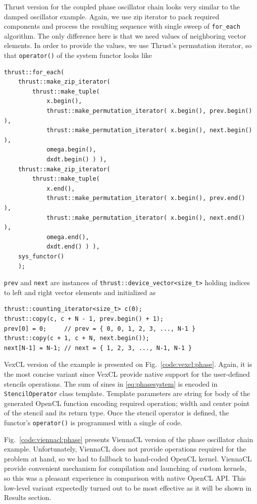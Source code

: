 \documentclass[1p]{elsarticle}
\newcommand{\code}[1]{\lstinline|#1|}
\newcommand{\figref}[1]{Fig.~\ref{#1}}
\begin{document}
Thrust version for the coupled phase oscillator chain looks very similar to the
damped oscillator example. Again, we use zip iterator to pack required
components and process the resulting sequence with single sweep of
\code{for_each} algorithm. The only difference here is that we need values of
neighboring vector elements. In order to provide the values, we use Thrust's
permutation iterator, so that \code{operator()} of the system functor looks
like
\begin{lstlisting}[frame=leftline]
thrust::for_each(
    thrust::make_zip_iterator(
        thrust::make_tuple(
            x.begin(),
            thrust::make_permutation_iterator( x.begin(), prev.begin() ),
            thrust::make_permutation_iterator( x.begin(), next.begin() ),
            omega.begin(),
            dxdt.begin() ) ),
    thrust::make_zip_iterator(
        thrust::make_tuple(
            x.end(),
            thrust::make_permutation_iterator( x.begin(), prev.end() ),
            thrust::make_permutation_iterator( x.begin(), next.end() ),
            omega.end(),
            dxdt.end() ) ),
    sys_functor()
    );
\end{lstlisting}
\code{prev} and \code{next} are instances of
\code{thrust::device_vector<size_t>} holding indices to left and right vector
elements and initialized as
\begin{lstlisting}[frame=leftline]
thrust::counting_iterator<size_t> c(0);
thrust::copy(c, c + N - 1, prev.begin() + 1);
prev[0] = 0;     // prev = { 0, 0, 1, 2, 3, ..., N-1 }
thrust::copy(c + 1, c + N, next.begin());
next[N-1] = N-1; // next = { 1, 2, 3, ..., N-1, N-1 }
\end{lstlisting}

VexCL version of the example is presented on \figref{code:vexcl:phase}. Again,
it is the most concise variant since VexCL provide native support for the
user-defined stencils operations. The sum of sines in \eqref{eq:phasesystem} is
encoded in \code{StencilOperator} class template. Template parameters are
string for body of the generated OpenCL function encoding required operation;
width and center point of the stencil and its return type. Once the stencil
operator is defined, the functor's \code{operator()} is programmed with a
single of code.

\figref{code:viennacl:phase} presents ViennaCL version of the phase oscillator
chain example. Unfortunately, ViennaCL does not provide operations required for
the problem at hand, so we had to fallback to hand-coded OpenCL kernel.
ViennaCL provide convenient mechanism for compilation and launching of custom
kernels, so this was a pleasant experience in comparison with native OpenCL
API. This low-level variant expectedly turned out to be most effective as it
will be shown in Results section.
\end{document}
